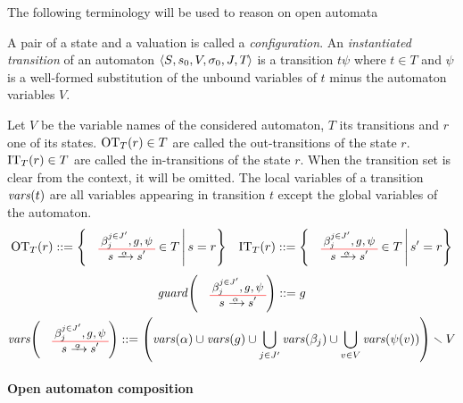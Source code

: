 \documentclass[runningheads]{llncs}
\begin{document}
The following terminology will be used to reason on open automata
\begin{definition}
A pair of a state and a valuation is called a \emph{configuration}.
An \emph{instantiated transition} of an automaton \(\OAg\) is a transition  \(t\psi\) where $t\in T$ and $\psi$ is a  well-formed substitution of the unbound variables of $t$  minus the automaton variables $V$.
\end{definition}



\begin{definition}
Let \(V\) be the variable names of the considered automaton, \(T\) its transitions and \(r\) one of its states.
\(\fOT[T]{r} \in T\) are called the out-transitions of the state \(r\).
\(\fIT[T]{r} \in T\) are called the in-transitions of the state \(r\).
When the transition set is clear from the context, it will be omitted.
The local variables of a transition \(\fvars{t}\) are all variables appearing in transition \(t\) except the global variables of the automaton.
\begin{align*}
	\fOT[T]{r} & ::= \mset{\OTg \in T}{s = r} &
	\fIT[T]{r} & ::= \mset{\OTg \in T}{s' = r} \\
\end{align*}
\vspace{-1cm}
\begin{gather*}
	\fguard{\OTg} ::= g \\
	\fvars{\OTg} ::= \mpar{\fvars{\alpha} \cup \fvars{g} \cup \bigcup_{j \in J'} \fvars{\beta_j} \cup \bigcup_{v \in V} \fvars{\psi\mpar{v}}} \setminus V
\end{gather*}
\end{definition}


\paragraph{Open automaton composition}
\end{document}
